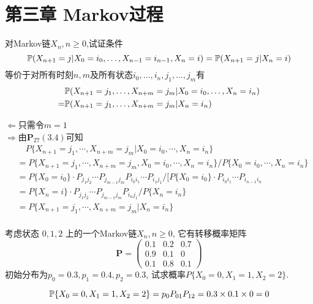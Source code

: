 \section{第三章 Markov过程}
\begin{problem}{3.1}
对Markov链$X_n,n\geqslant 0$,试证条件\[\mathbb{P}(X_{n+1}=j|X_0=i_0,\dots ,X_{n-1}=i_{n-1},X_n=i)=\mathbb{P}(X_{n+1}=j|X_n=i)\]
等价于对所有时刻$n,m$及所有状态$i_0,\dots , i_n,j_1,\dots ,j_m$有
\[\begin{aligned}
		  & \mathbb{P}(X_{n+1}=j_1,\dots ,X_{n+m}=j_m|X_0=i_0, \dots , X_n=i_n) \\
		= & \mathbb{P}(X_{n+1}=j_1,\dots ,X_{n+m}=j_m|X_n=i_n)
	\end{aligned}\]
\end{problem}
\begin{solution}
	$\Leftarrow $只需令$m=1$\\
	$\Rightarrow $由$\mathbf{P}_{27}(3.4)$可知
	\[\begin{split}
			& \quad P\{X_{n+1} = j_1, \cdots, X_{n+m} = j_m | X_0 = i_0, \cdots, X_n = i_n\}\\
			& = P\{X_{n+1} = j_1, \cdots, X_{n+m} = j_m , X_0 = i_0, \cdots, X_n = i_n\} / P\{X_0 = i_0, \cdots, X_n = i_n\}\\
			& = P\{X_0 = i_0\} \cdot P_{j_1j_2} \cdots P_{j_{m-1}j_m} P_{i_0i_1} \cdots P_{i_1j_1} / [P\{X_0 = i_0\} \cdot P_{i_0i_1} \cdots P_{i_{n-1}i_n}\\
			& = P\{X_n = i\} \cdot P_{j_1j_2} \cdots P_{j_{m-1}j_m} P_{i_nj_1} / P\{X_n = i_n\}\\
			& = P\{X_{n+1} = j_1, \cdots, X_{n+m} = j_m | X_n = i_n\}\\
		\end{split}\]
\end{solution}

\begin{problem}{3.2}
考虑状态 $ 0,1,2 $ 上的一个Markov链$X_n, n \geqslant 0$, 它有转移概率矩阵
\[\bm{P} = \begin{pmatrix}
		0.1 & 0.2 & 0.7 \\
		0.9 & 0.1 & 0   \\
		0.1 & 0.8 & 0.1
	\end{pmatrix}\]
初始分布为$p_0 = 0.3, p_1 = 0.4, p_2 = 0.3$, 试求概率$P\{X_0 = 0, X_1 = 1, X_2 = 2\}$.
\end{problem}
\begin{solution}
	\[\mathbb{P}\{X_0 = 0, X_1 = 1, X_2 = 2\} = p_0P_{01}P_{12} = 0.3 \times 0.1 \times 0 = 0\]
\end{solution}

